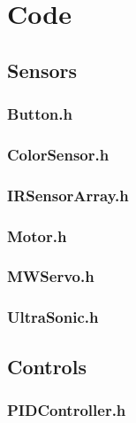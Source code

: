 \documentclass{article}
\begin{document}
\section{Code}

\subsection{Sensors}

\subsubsection{Button.h}


\subsubsection{ColorSensor.h}


\subsubsection{IRSensorArray.h}


\subsubsection{Motor.h}


\subsubsection{MWServo.h}


\subsubsection{UltraSonic.h}


\subsection{Controls}
\subsubsection{PIDController.h}

\end{document}
